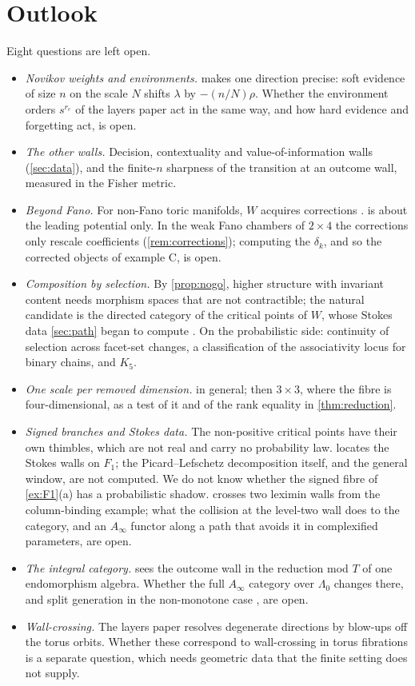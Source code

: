 \documentclass[11pt]{article}
\theoremstyle{definition}\newtheorem{definition}[theorem]{Definition}\newtheorem{remark}[theorem]{Remark}\newtheorem{example}[theorem]{Example}\newtheorem{problem}[theorem]{Open problem}\crefname{problem}{Problem}{Problems}
\begin{document}
\section{Outlook}\label{sec:outlook}
Eight questions are left open.
\begin{itemize}
\item \emph{Novikov weights and environments.}  makes one direction precise: soft evidence of size $n$ on the scale $N$ shifts $\lambda$ by $-(n/N)\rho$.
  Whether the environment orders $s^{r_e}$ of the layers paper act in the same way, and how hard evidence and forgetting act, is open.
\item \emph{The other walls.} Decision, contextuality and value-of-information walls (\cref{sec:data}), and the finite-$n$ sharpness of the transition at an outcome wall,
  measured in the Fisher metric.
\item \emph{Beyond Fano.} For non-Fano toric manifolds, $W$ acquires corrections \cite{FOOO2010}.  is about the leading potential only. In the weak Fano chambers of
  $2\times4$ the corrections only rescale coefficients (\cref{rem:corrections}); computing the $\delta_k$, and so the corrected objects of example C, is open.
\item \emph{Composition by selection.} By \cref{prop:nogo}, higher structure with invariant content needs morphism spaces that are not contractible; the natural candidate is the directed
  category of the critical points of $W$, whose Stokes data \cref{sec:path} began to compute \cite{Seidel2008}. On the probabilistic side: continuity of selection across facet-set changes, a
  classification of the associativity locus for binary chains, and $K_5$.
\item \emph{One scale per removed dimension.}  in general; then $3\times3$, where the fibre is four-dimensional, as a test of it and of the rank equality in \cref{thm:reduction}.
\item \emph{Signed branches and Stokes data.} The non-positive critical points have their own thimbles, which are not real and carry no
  probability law.  locates the Stokes walls on $F_1$; the Picard--Lefschetz decomposition itself, and the general window, are not computed. We do not
  know whether the signed fibre of \cref{ex:F1}(a) has a probabilistic shadow.  crosses two leximin walls from the column-binding example; what the collision at the level-two wall does to the category, and an $A_\infty$ functor along a path that avoids it in complexified parameters, are open.
\item \emph{The integral category.}  sees the outcome wall in the reduction mod $T$ of one endomorphism algebra. Whether the full $A_\infty$ category over $\Lambda_0$ changes there,
  and split generation in the non-monotone case \cite{Smith2018}, are open.
\item \emph{Wall-crossing.} The layers paper resolves degenerate directions by blow-ups off the torus orbits. Whether these correspond to
  wall-crossing in torus fibrations is a separate question, which needs geometric data that the finite setting does not supply.
\end{itemize}
\end{document}
